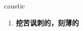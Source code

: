 
\begin{frame}
{\huge caustic}
\begin{center}
\begin{enumerate}\Large
  \item \textbf{挖苦讽刺的，刻薄的}
\end{enumerate}
\end{center}
\end{frame}
